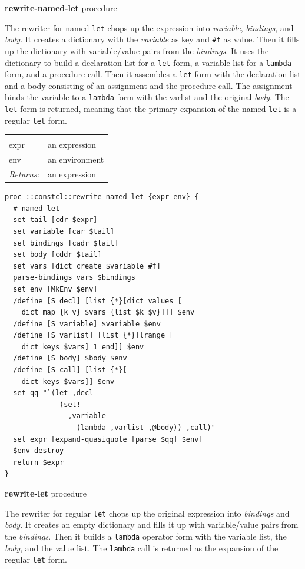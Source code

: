 \documentclass[twoside,9pt]{report}
\begin{document}
\textbf{rewrite-named-let} procedure


The rewriter for named \texttt{let} chops up the expression into \emph{variable}, \emph{bindings}, and \emph{body}. It creates a dictionary with the \emph{variable} as key and \texttt{\#f} as value. Then it fills up the dictionary with variable/value pairs from the \emph{bindings}. It uses the dictionary to build a declaration list for a \texttt{let} form, a variable list for a \texttt{lambda} form, and a procedure call. Then it assembles a \texttt{let} form with the declaration list and a body consisting of an assignment and the procedure call. The assignment binds the variable to a \texttt{lambda} form with the varlist and the original \emph{body}. The \texttt{let} form is returned, meaning that the primary expansion of the named \texttt{let} is a regular \texttt{let} form.

\noindent\begin{tabular}{ |p{1.9cm} p{8cm}| }
\hline
\rowcolor[HTML]{CCCCCC} \multicolumn{2}{|l|}{\bf rewrite-named-let (internal)} \\
expr & an expression \\
env & an environment \\
\textit{Returns:} & an expression \\
\hline
\end{tabular}
\begin{lstlisting}
proc ::constcl::rewrite-named-let {expr env} {
  # named let
  set tail [cdr $expr]
  set variable [car $tail]
  set bindings [cadr $tail]
  set body [cddr $tail]
  set vars [dict create $variable #f]
  parse-bindings vars $bindings
  set env [MkEnv $env]
  /define [S decl] [list {*}[dict values [
    dict map {k v} $vars {list $k $v}]]] $env
  /define [S variable] $variable $env
  /define [S varlist] [list {*}[lrange [
    dict keys $vars] 1 end]] $env
  /define [S body] $body $env
  /define [S call] [list {*}[
    dict keys $vars]] $env
  set qq "`(let ,decl
             (set!
               ,variable
                 (lambda ,varlist ,@body)) ,call)"
  set expr [expand-quasiquote [parse $qq] $env]
  $env destroy
  return $expr
}
\end{lstlisting}


\textbf{rewrite-let} procedure


The rewriter for regular \texttt{let} chops up the original expression into \emph{bindings} and \emph{body}. It creates an empty dictionary and fills it up with variable/value pairs from the \emph{bindings}. Then it builds a \texttt{lambda} operator form with the variable list, the \emph{body}, and the value list. The \texttt{lambda} call is returned as the expansion of the regular \texttt{let} form.
\end{document}
